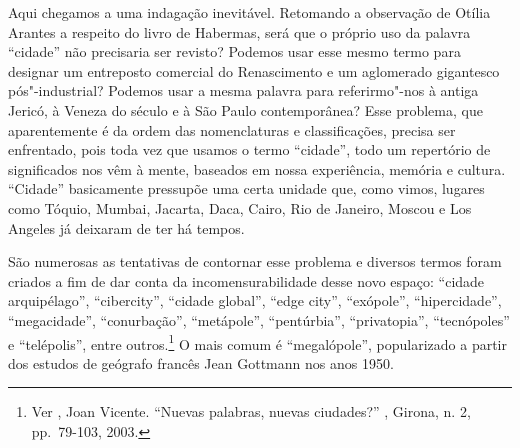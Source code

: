 Aqui chegamos a uma indagação inevitável. Retomando a observação de
Otília Arantes a respeito do livro de Habermas, será que o próprio uso
da palavra ``cidade'' não precisaria ser revisto? Podemos usar esse
mesmo termo para designar um entreposto comercial do Renascimento e um
aglomerado gigantesco pós"-industrial? Podemos usar a mesma palavra para
referirmo"-nos à antiga Jericó, à Veneza do século  e à São Paulo
contemporânea? Esse problema, que aparentemente é da ordem das
nomenclaturas e classificações, precisa ser enfrentado, pois toda vez
que usamos o termo ``cidade'', todo um repertório de significados nos
vêm à mente, baseados em nossa experiência, memória e cultura.
``Cidade'' basicamente pressupõe uma certa unidade que, como vimos,
lugares como Tóquio, Mumbai, Jacarta, Daca, Cairo, Rio de Janeiro,
Moscou e Los Angeles já deixaram de ter há tempos.

São numerosas as tentativas de contornar esse problema e diversos termos
foram criados a fim de dar conta da incomensurabilidade desse novo
espaço: ``cidade arquipélago'', ``cibercity'', ``cidade global'', ``edge
city'', ``exópole'', ``hipercidade'', ``megacidade'', ``conurbação'',
``metápole'', ``pentúrbia'', ``privatopia'', ``tecnópoles'' e
``telépolis'', entre outros.\footnote{Ver , Joan Vicente. ``Nuevas
  palabras, nuevas ciudades?'' {}, Girona, n.
  2, pp.~79-103, 2003.} O mais comum é ``megalópole'', popularizado a
partir dos estudos de geógrafo francês Jean Gottmann nos anos 1950.


